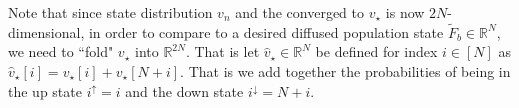 \documentclass[sigconf, review]{acmart}
\newcommand{\R}{\mathbb{R}}
\begin{document}
Note that since state distribution $v_n$ and the converged to $v_\star$ is now $2N$-dimensional, in order to compare to a desired diffused population state $\tilde F_b \in \R^N$, we need to ``fold" $v_\star$ into $\R^{2N}$.  That is let $\hat v_\star \in \R^N$ be defined for index $i \in [N]$ as $\hat v_\star[i] = v_\star[i] + v_\star[N+i]$.  That is we add together the probabilities of being in the up state $i^\uparrow = i$ and the down state $i^\downarrow = N+i$.  








\end{document}
